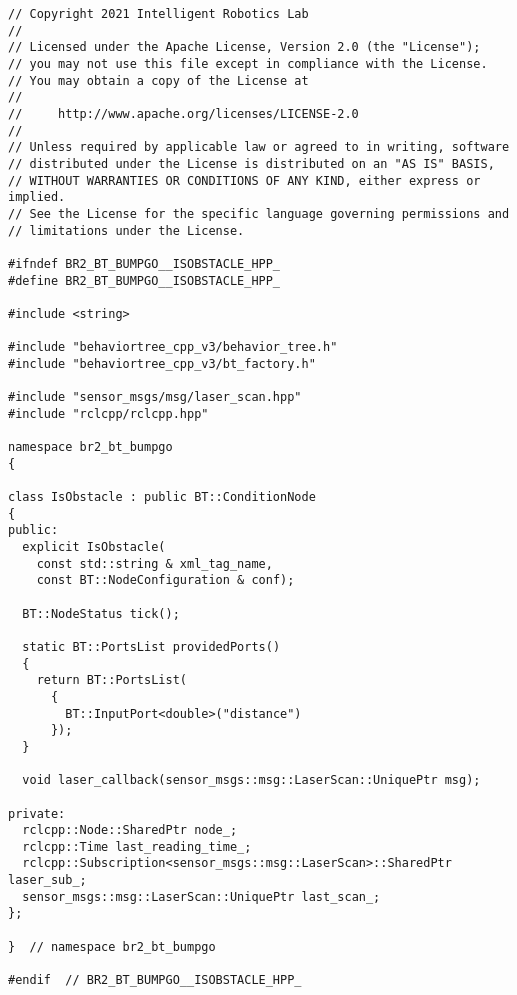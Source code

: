  \footnotesize
\begin{tcolorbox}[sharp corners, colframe=gray!80, colback=LightGray, left=0pt, top=0pt, bottom=0pt, title=\texttt{br2\_bt\_bumpgo/include/br2\_bt\_bumpgo/IsObstacle.hpp}]
  \begin{verbatim}
// Copyright 2021 Intelligent Robotics Lab
//
// Licensed under the Apache License, Version 2.0 (the "License");
// you may not use this file except in compliance with the License.
// You may obtain a copy of the License at
//
//     http://www.apache.org/licenses/LICENSE-2.0
//
// Unless required by applicable law or agreed to in writing, software
// distributed under the License is distributed on an "AS IS" BASIS,
// WITHOUT WARRANTIES OR CONDITIONS OF ANY KIND, either express or implied.
// See the License for the specific language governing permissions and
// limitations under the License.

#ifndef BR2_BT_BUMPGO__ISOBSTACLE_HPP_
#define BR2_BT_BUMPGO__ISOBSTACLE_HPP_

#include <string>

#include "behaviortree_cpp_v3/behavior_tree.h"
#include "behaviortree_cpp_v3/bt_factory.h"

#include "sensor_msgs/msg/laser_scan.hpp"
#include "rclcpp/rclcpp.hpp"

namespace br2_bt_bumpgo
{

class IsObstacle : public BT::ConditionNode
{
public:
  explicit IsObstacle(
    const std::string & xml_tag_name,
    const BT::NodeConfiguration & conf);

  BT::NodeStatus tick();

  static BT::PortsList providedPorts()
  {
    return BT::PortsList(
      {
        BT::InputPort<double>("distance")
      });
  }

  void laser_callback(sensor_msgs::msg::LaserScan::UniquePtr msg);

private:
  rclcpp::Node::SharedPtr node_;
  rclcpp::Time last_reading_time_;
  rclcpp::Subscription<sensor_msgs::msg::LaserScan>::SharedPtr laser_sub_;
  sensor_msgs::msg::LaserScan::UniquePtr last_scan_;
};

}  // namespace br2_bt_bumpgo

#endif  // BR2_BT_BUMPGO__ISOBSTACLE_HPP_
    \end{verbatim}
    \end{tcolorbox}
  \normalsize

